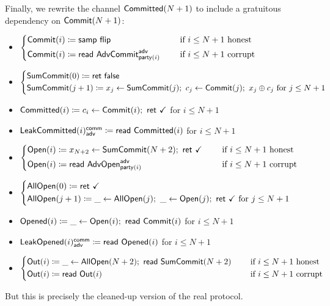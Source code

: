 \noindent Finally, we rewrite the channel $\mathsf{Committed}(N+1)$ to include a gratuitous dependency on $\mathsf{Commit}(N+1)$:

\begin{itemize}
\item {\color{blue} $\begin{cases*} \Commit(i) \coloneqq \samp{\flip} & \hspace{10pt} \text{if $i \leq N+1$ honest} \\ \Commit(i) \coloneqq \read{\AdvCommit^\adv_{\party(i)}} & \hspace{10pt} \text{if $i \leq N+1$ corrupt} \end{cases*}$}
\item {\color{blue} $\begin{cases*} \SumCommit(0) \coloneqq \ret{\false} \\ \SumCommit(j+1) \coloneqq x_j \leftarrow \SumCommit(j); \ c_j \leftarrow \Commit(j); \ x_j \oplus c_j \text{ for $j \leq N+1$} \end{cases*}$}
\item {\color{magenta} $\mathsf{Committed}(i) \coloneqq c_i \leftarrow \mathsf{Commit}(i); \ \mathsf{ret} \ \checkmark$ for $i \leq N+1$}
\item {\color{magenta} $\mathsf{LeakCommitted}(i)^{\mathsf{comm}}_{\mathsf{adv}} \coloneqq \mathsf{read} \ \mathsf{Committed}(i)$ for $i \leq N+1$}
\item {\color{teal} $\begin{cases*} \Open(i) \coloneqq x_{N+2} \leftarrow \SumCommit(N+2); \ \ret{\checkmark} & \hspace{10pt} \text{if $i \leq N+1$ honest} \\ \Open(i) \coloneqq \read{\AdvOpen^\adv_{\party(i)}} & \hspace{10pt} \text{if $i \leq N+1$ corrupt} \end{cases*}$}
\item {\color{teal} $\begin{cases*} \AllOpen(0) \coloneqq \ret{\checkmark} \\ \AllOpen(j+1) \coloneqq \_ \leftarrow \AllOpen(j); \ \_ \leftarrow \Open(j); \ \ret{\checkmark} \text{ for $j \leq N+1$} \end{cases*}$}
\item {\color{red} $\mathsf{Opened}(i) \coloneqq \_ \leftarrow \mathsf{Open}(i); \ \mathsf{read} \ \mathsf{Commit}(i)$ for $i \leq N+1$}
\item {\color{red} $\mathsf{LeakOpened}(i)^{\mathsf{comm}}_{\mathsf{adv}} \coloneqq \mathsf{read} \ \mathsf{Opened}(i)$ for $i \leq N+1$}
\item $\begin{cases*} \Out(i) \coloneqq \_ \leftarrow \AllOpen(N+2); \ \read{\SumCommit(N+2)} & \hspace{10pt} \text{if $i \leq N+1$ honest} \\ \Out(i) \coloneqq \read{\Out(i)} & \hspace{10pt} \text{if $i \leq N+1$ corrupt} \end{cases*}$
\end{itemize}

\noindent But this is precisely the cleaned-up version of the real protocol.